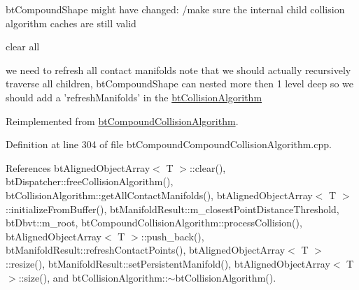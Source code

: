 btCompoundShape might have changed: /make sure the internal child collision algorithm caches are still valid

clear all

we need to refresh all contact manifolds note that we should actually recursively traverse all children, btCompoundShape can nested more then 1 level deep so we should add a 'refreshManifolds' in the \hyperlink{classbt_collision_algorithm}{btCollisionAlgorithm} 

Reimplemented from \hyperlink{classbt_compound_collision_algorithm_173ce993461795e0572dd2924c54cdc0}{btCompoundCollisionAlgorithm}.

Definition at line 304 of file btCompoundCompoundCollisionAlgorithm.cpp.

References btAlignedObjectArray$<$ T $>$::clear(), btDispatcher::freeCollisionAlgorithm(), btCollisionAlgorithm::getAllContactManifolds(), btAlignedObjectArray$<$ T $>$::initializeFromBuffer(), btManifoldResult::m\_\-closestPointDistanceThreshold, btDbvt::m\_\-root, btCompoundCollisionAlgorithm::processCollision(), btAlignedObjectArray$<$ T $>$::push\_\-back(), btManifoldResult::refreshContactPoints(), btAlignedObjectArray$<$ T $>$::resize(), btManifoldResult::setPersistentManifold(), btAlignedObjectArray$<$ T $>$::size(), and btCollisionAlgorithm::$\sim$btCollisionAlgorithm().

